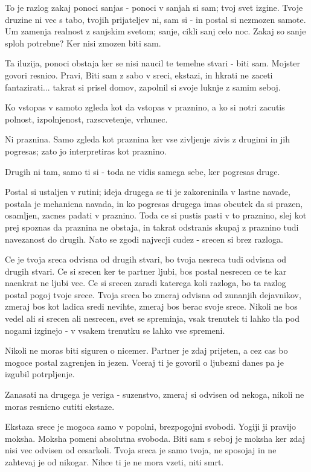 To je razlog zakaj ponoci sanjas - ponoci v sanjah si sam; tvoj svet izgine. Tvoje druzine ni vec s tabo, tvojih prijateljev ni, sam si - in postal si nezmozen samote. Um zamenja realnost z sanjskim svetom; sanje, cikli sanj celo noc. Zakaj so sanje sploh potrebne? Ker nisi zmozen biti sam. 

Ta iluzija, ponoci obstaja ker se nisi naucil te temelne stvari - biti sam. Mojster govori resnico. Pravi,  Biti sam z sabo v sreci, ekstazi, in hkrati ne zaceti fantazirati... takrat si prisel domov, zapolnil si svoje luknje z samim seboj. 

Ko vstopas v samoto zgleda kot da vstopas v praznino, a ko si notri zacutis polnost, izpolnjenost, razscvetenje, vrhunec. 

Ni praznina. Samo zgleda kot praznina ker vse zivljenje zivis z drugimi in jih pogresas; zato jo interpretiras kot praznino. 

Drugih ni tam, samo ti si - toda ne vidis samega sebe, ker pogresas druge. 

Postal si ustaljen v rutini; ideja drugega se ti je zakoreninila v lastne navade, postala je mehanicna navada, in ko pogresas drugega imas obcutek da si prazen, osamljen, zacnes padati v praznino. Toda ce si pustis pasti v to praznino, slej kot prej spoznas da praznina ne obstaja, in takrat odstranis skupaj z praznino tudi navezanost do drugih. Nato se zgodi najvecji cudez - srecen si brez razloga. 

Ce je tvoja sreca odvisna od drugih stvari, bo tvoja nesreca tudi odvisna od drugih stvari. Ce si srecen ker te partner ljubi, bos postal nesrecen ce te kar naenkrat ne ljubi vec. Ce si srecen zaradi katerega koli razloga, bo ta razlog postal pogoj tvoje srece. Tvoja sreca bo zmeraj odvisna od zunanjih dejavnikov, zmeraj bos kot ladica sredi nevihte, zmeraj bos berac svoje srece. Nikoli ne bos vedel ali si srecen ali nesrecen, svet se spreminja, vsak trenutek ti lahko tla pod nogami izginejo - v vsakem trenutku se lahko vse spremeni. 

Nikoli ne moras biti siguren o nicemer. Partner je zdaj prijeten, a cez cas bo mogoce postal zagrenjen in jezen. Vceraj ti je govoril o ljubezni danes pa je izgubil potrpljenje. 

Zanasati na drugega je veriga - suzenstvo, zmeraj si odvisen od nekoga, nikoli ne moras resnicno cutiti ekstaze. 

Ekstaza srece je mogoca samo v popolni, brezpogojni svobodi. Yogiji ji pravijo moksha. Moksha pomeni absolutna svoboda. Biti sam s seboj je moksha ker zdaj nisi vec odvisen od cesarkoli. Tvoja sreca je samo tvoja, ne sposojaj in ne zahtevaj je od nikogar. Nihce ti je ne mora vzeti, niti smrt. 

